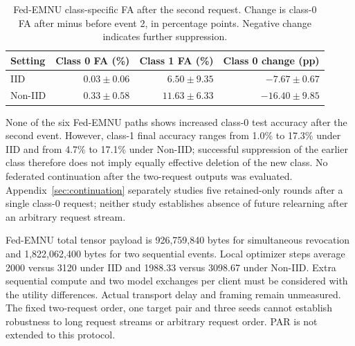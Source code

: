 \begin{table}[H]\centering\small

\caption{Fed-EMNU class-specific FA after the second request. Change is class-0 FA after minus before event 2, in percentage points. Negative change indicates further suppression.}

\label{tab:sequence-rebound}

\begin{tabular}{lrrr}\toprule Setting & Class 0 FA (\%) & Class 1 FA (\%) & Class 0 change (pp)\\\midrule

IID & $0.03 \pm 0.06$ & $6.50 \pm 9.35$ & $-7.67 \pm 0.67$\\

Non-IID & $0.33 \pm 0.58$ & $11.63 \pm 6.33$ & $-16.40 \pm 9.85$\\

\bottomrule\end{tabular}\end{table}

None of the six Fed-EMNU paths shows increased class-0 test accuracy after the second event. However, class-1 final accuracy ranges from 1.0\% to 17.3\% under IID and from 4.7\% to 17.1\% under Non-IID; successful suppression of the earlier class therefore does not imply equally effective deletion of the new class. No federated continuation after the two-request outputs was evaluated. Appendix~\ref{sec:continuation} separately studies five retained-only rounds after a single class-0 request; neither study establishes absence of future relearning after an arbitrary request stream.

Fed-EMNU total tensor payload is 926,759,840 bytes for simultaneous revocation and 1,822,062,400 bytes for two sequential events. Local optimizer steps average 2000 versus 3120 under IID and 1988.33 versus 3098.67 under Non-IID. Extra sequential compute and two model exchanges per client must be considered with the utility differences. Actual transport delay and framing remain unmeasured. The fixed two-request order, one target pair and three seeds cannot establish robustness to long request streams or arbitrary request order. PAR is not extended to this protocol.
